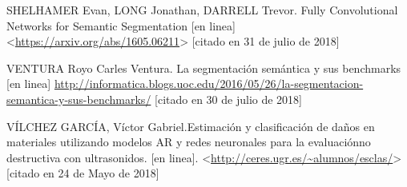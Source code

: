 SHELHAMER Evan, LONG Jonathan, DARRELL Trevor. Fully Convolutional Networks for Semantic Segmentation [en linea] <\url{https://arxiv.org/abs/1605.06211}> [citado en 31 de julio de 2018]

VENTURA Royo Carles Ventura. La segmentación semántica y sus benchmarks [en linea] \url{http://informatica.blogs.uoc.edu/2016/05/26/la-segmentacion-semantica-y-sus-benchmarks/} [citado en 30 de julio de 2018]

VÍLCHEZ GARCÍA, Víctor Gabriel.Estimación y clasificación de daños en materiales utilizando modelos AR y redes neuronales para la evaluaciónno destructiva con ultrasonidos. [en linea].  <\url{http://ceres.ugr.es/~alumnos/esclas/}> [citado en 24 de Mayo de 2018]



















